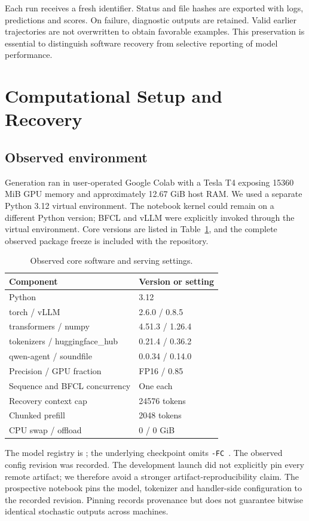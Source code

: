 \documentclass[conference]{IEEEtran}
\newcommand{\code}[1]{\texttt{#1}}
\begin{document}
Each run receives a fresh identifier. Status and file hashes are exported with logs, predictions and scores. On failure, diagnostic outputs are retained. Valid earlier trajectories are not overwritten to obtain favorable examples. This preservation is essential to distinguish software recovery from selective reporting of model performance.

\section{Computational Setup and Recovery}
\subsection{Observed environment}
Generation ran in user-operated Google Colab with a Tesla T4 exposing 15360 MiB GPU memory and approximately 12.67 GiB host RAM. We used a separate Python 3.12 virtual environment. The notebook kernel could remain on a different Python version; BFCL and vLLM were explicitly invoked through the virtual environment. Core versions are listed in Table~\ref{tab:environment}, and the complete observed package freeze is included with the repository.

\begin{table}[t]\caption{Observed core software and serving settings.}\label{tab:environment}\centering\small
\begin{tabular}{ll}\toprule
Component & Version or setting\\\midrule
Python & 3.12\\
torch / vLLM & 2.6.0 / 0.8.5\\
transformers / numpy & 4.51.3 / 1.26.4\\
tokenizers / huggingface\_hub & 0.21.4 / 0.36.2\\
qwen-agent / soundfile & 0.0.34 / 0.14.0\\
Precision / GPU fraction & FP16 / 0.85\\
Sequence and BFCL concurrency & One each\\
Recovery context cap & 24576 tokens\\
Chunked prefill & 2048 tokens\\
CPU swap / offload & 0 / 0 GiB\\\bottomrule
\end{tabular}
\end{table}

The model registry is ; the underlying checkpoint omits \code{-FC}~\cite{qwencheckpoint}. The observed config revision was recorded. The development launch did not explicitly pin every remote artifact; we therefore avoid a stronger artifact-reproducibility claim. The prospective notebook pins the model, tokenizer and handler-side configuration to the recorded revision. Pinning records provenance but does not guarantee bitwise identical stochastic outputs across machines.
\end{document}

